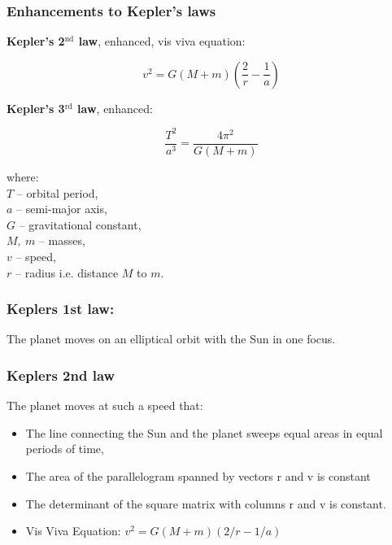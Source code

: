 \documentclass[aspectratio=169,xcolor=pdftex,dvipsnames]{beamer} %
\begin{document}
\begin{frame}
\frametitle{Enhancements to Kepler's laws}

\textbf{Kepler's 2$^{\text{nd}}$ law}, enhanced, vis viva equation:

$$v^2 = G(M+m) \left(\frac{2}{r} - \frac{1}{a}\right)$$

\textbf{Kepler's 3$^{\text{rd}}$ law}, enhanced:

$$ \frac{T^2}{a^3} = \frac{4\pi^2}{G(M+m)}$$

where:\\
$T$ -- orbital period,\\
$a$ -- semi-major axis,\\
$G$ -- gravitational constant,\\
$M,\ m$ -- masses,\\
$v$ -- speed,\\
$r$ -- radius i.e. distance $M$ to $m$.

\end{frame}



\begin{frame}
\frametitle{Keplers 1st law:}

   The planet moves on an elliptical orbit with the Sun in one focus.

\end{frame}


\begin{frame}
\frametitle{Keplers 2nd law}

The planet moves at such a speed that:
\begin{itemize}
\item
    The line connecting the Sun and the planet
    sweeps equal areas in equal periods of time,
\item
    The area of the parallelogram spanned by vectors r and v is constant
\item
    The determinant of the square matrix with columns r and v is constant.
\item
    Vis Viva Equation: $v^2 = G(M+m)(2/r - 1/a)$
\end{itemize}

\end{frame}
\end{document}
